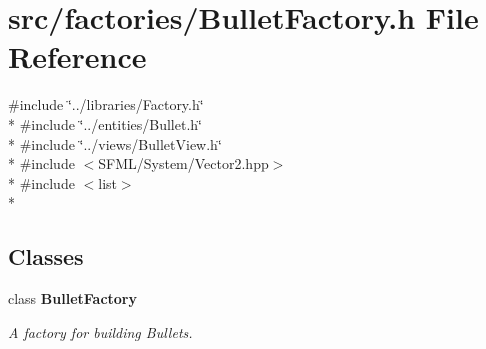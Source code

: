 \section{src/factories/\-Bullet\-Factory.h File Reference}
\label{_bullet_factory_8h}
{\ttfamily \#include \char`\"{}../libraries/\-Factory.\-h\char`\"{}}\\*
{\ttfamily \#include \char`\"{}../entities/\-Bullet.\-h\char`\"{}}\\*
{\ttfamily \#include \char`\"{}../views/\-Bullet\-View.\-h\char`\"{}}\\*
{\ttfamily \#include $<$S\-F\-M\-L/\-System/\-Vector2.\-hpp$>$}\\*
{\ttfamily \#include $<$list$>$}\\*
\subsection*{Classes}
\begin{DoxyCompactItemize}
\item 
class {\bf Bullet\-Factory}
\begin{DoxyCompactList}\small\item\em A factory for building Bullets. \end{DoxyCompactList}\end{DoxyCompactItemize}
